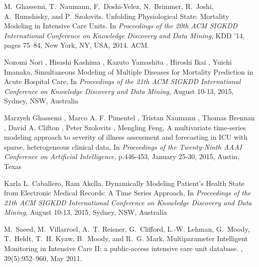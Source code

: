 \documentclass[journal]{IEEEtran}
\begin{document}
%
%
\begin{thebibliography}{1}

M.~Ghassemi, T.~Naumann, F.~Doshi-Velez, N.~Brimmer, R.~Joshi, A.~Rumshisky,
  and P.~Szolovits.
\newblock Unfolding {Physiological} {State}: {Mortality} {Modeling} in
  {Intensive} {Care} {Units}.
\newblock In {\em Proceedings of the 20th {ACM} {SIGKDD} {International}
  {Conference} on {Knowledge} {Discovery} and {Data} {Mining}}, {KDD} '14,
  pages 75--84, New York, NY, USA, 2014. ACM.

Nozomi Nori , Hisashi Kashima , Kazuto Yamashita , Hiroshi Ikai , Yuichi Imanaka, 
\newblock Simultaneous Modeling of Multiple Diseases for Mortality Prediction in Acute Hospital Care, 
\newblock In {\em Proceedings of the 21th {ACM} {SIGKDD} {International} {Conference} on {Knowledge} {Discovery} 
and {Data} {Mining}}, August 10-13, 2015, Sydney, NSW, Australia

Marzyeh Ghassemi , Marco A. F. Pimentel , Tristan Naumann , Thomas Brennan , David A. Clifton , Peter Szolovits , Mengling Feng, 
\newblock A multivariate time-series modeling approach to severity of illness assessment and forecasting in ICU with sparse, heterogeneous clinical data, 
\newblock In {\em {Proceedings} of the {Twenty-Ninth} {AAAI} {Conference} on {Artificial} {Intelligence}}, p.446-453, January 25-30, 2015, Austin, Texas

Karla L. Caballero, Ram Akella, 
\newblock Dynamically Modeling Patient's Health State from Electronic Medical Records: A Time Series Approach, 
\newblock In {\em {Proceedings} of the {21th} {ACM} {SIGKDD} {International} {Conference} on {Knowledge} {Discovery} 
and {Data} {Mining}}, August 10-13, 2015, Sydney, NSW, Australia



M.~Saeed, M.~Villarroel, A.~T. Reisner, G.~Clifford, L.-W. Lehman, G.~Moody,
  T.~Heldt, T.~H. Kyaw, B.~Moody, and R.~G. Mark.
\newblock Multiparameter {Intelligent} {Monitoring} in {Intensive} {Care} {II}:
  a public-access intensive care unit database.
, 39(5):952--960, May 2011.


\end{thebibliography}
\end{document}
